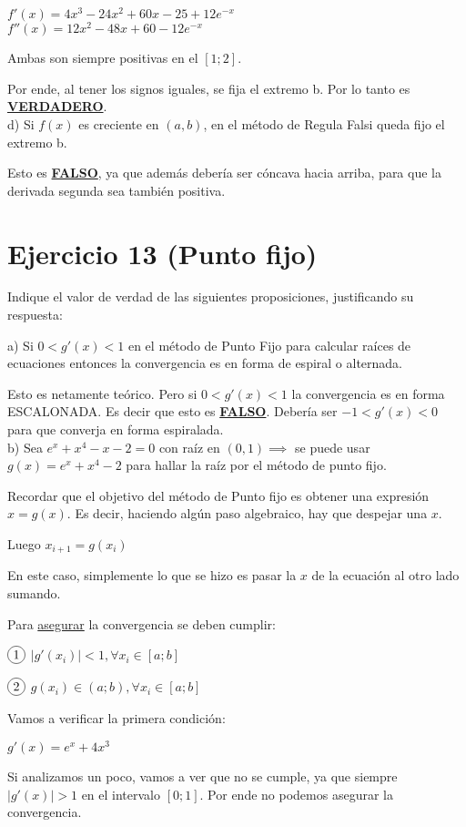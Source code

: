\documentclass[11pt]{article}
\newcommand*\circled[1]{\tikz[baseline=(char.base)]{
		\node[shape=circle,draw,inner sep=2pt] (char) {#1};}}
\begin{document}
	$f'(x)=4x^3-24x^2+60x-25+12e^{-x}$\\
	$f''(x)=12x^2-48x+60-12e^{-x}$
	
	Ambas son siempre positivas en el $[1; 2]$.
	
	Por ende, al tener los signos iguales, se fija el extremo b. Por lo tanto es \textbf{\underline{VERDADERO}}.\\
	
	d) Si $f(x)$ es creciente en $(a,b)$, en el método de Regula Falsi queda fijo el extremo b.
	
	Esto es \textbf{\underline{FALSO}}, ya que además debería ser cóncava hacia arriba, para que la derivada segunda sea también positiva.
	
	\section{Ejercicio 13 (Punto fijo)}
	Indique el valor de verdad de las siguientes proposiciones, justificando su respuesta:
	
	a) Si $0<g'(x)<1$ en el método de Punto Fijo para calcular raíces de ecuaciones entonces la convergencia es en forma de espiral o alternada.
	
	Esto es netamente teórico. Pero si $0<g'(x)<1$ la convergencia es en forma ESCALONADA. Es decir que esto es \textbf{\underline{FALSO}}. Debería ser $-1<g'(x)<0$ para que converja en forma espiralada. \\
	
	b) Sea $e^x+x^4-x-2=0$ con raíz en $(0,1) \implies $ se puede usar $g(x)=e^x+x^4-2$ para hallar la raíz por el método de punto fijo.
	
	Recordar que el objetivo del método de Punto fijo es obtener una expresión $x=g(x)$. Es decir, haciendo algún paso algebraico, hay que despejar una $x$.
	
	Luego $x_{i+1}=g(x_i)$
	
	En este caso, simplemente lo que se hizo es pasar la $x$ de la ecuación al otro lado sumando.
	
	Para \underline{asegurar} la convergencia se deben cumplir:
	
	$\circled{1}$ $|g'(x_i)|<1, \forall x_i \in [a;b]$
	
	$\circled{2}$ $g(x_i) \in (a;b), \forall x_i \in [a;b]$
	
	Vamos a verificar la primera condición:
	
	$g'(x)=e^x+4x^3$
	
	Si analizamos un poco, vamos a ver que no se cumple, ya que siempre $|g'(x)|>1$ en el intervalo $[0;1]$. Por ende no podemos asegurar la convergencia.
	
\end{document}
